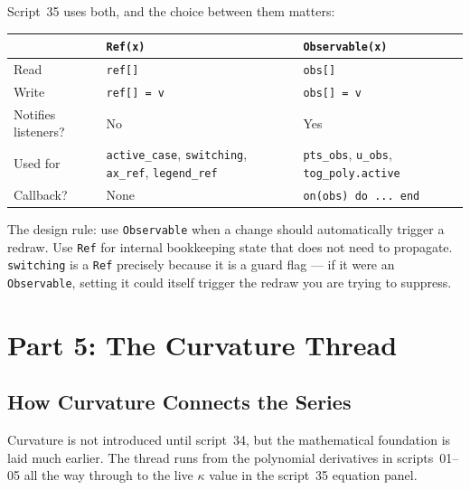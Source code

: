 \documentclass[12pt, a4paper]{article}
\newcommand{\cd}[1]{\texttt{#1}}
\begin{document}
Script~35 uses both, and the choice between them matters:

\begin{center}
\begin{tabular}{lp{4.5cm}p{4.5cm}}
\toprule
& \cd{Ref(x)} & \cd{Observable(x)} \\
\midrule
Read & \cd{ref[]} & \cd{obs[]} \\
Write & \cd{ref[] = v} & \cd{obs[] = v} \\
Notifies listeners? & No & Yes \\
Used for & \cd{active\_case}, \cd{switching},
  \cd{ax\_ref}, \cd{legend\_ref} &
  \cd{pts\_obs}, \cd{u\_obs},
  \cd{tog\_poly.active} \\
Callback? & None & \cd{on(obs) do ... end} \\
\bottomrule
\end{tabular}
\end{center}

The design rule: use \cd{Observable} when a change should
automatically trigger a redraw.
Use \cd{Ref} for internal bookkeeping state that does not
need to propagate.
\cd{switching} is a \cd{Ref} precisely because it is a
guard flag --- if it were an \cd{Observable}, setting it
could itself trigger the redraw you are trying to suppress.


\section{Part 5: The Curvature Thread}

\subsection{How Curvature Connects the Series}

Curvature is not introduced until script~34,
but the mathematical foundation is laid much earlier.
The thread runs from the polynomial derivatives in
scripts~01--05 all the way through to the live
$\kappa$ value in the script~35 equation panel.
\end{document}
